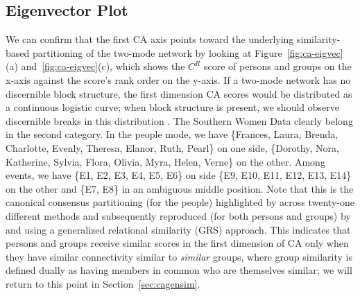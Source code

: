 \documentclass[a4paper,fleqn]{cas-sc}
\begin{document}
\subsection{Eigenvector Plot} \label{subsec:eigplot}
We can confirm that the first CA axis points toward the underlying similarity-based partitioning of the two-mode network by looking at Figure~\ref{fig:ca-eigvec}(a) and~\ref{fig:ca-eigvec}(c), which shows the $C^R$ score of persons and groups on the x-axis against the score's rank order on the y-axis. If a two-mode network has no discernible block structure, the first dimension CA scores would be distributed as a continuous logistic curve; when block structure is present, we should observe discernible breaks in this distribution \citep{van2021correspondence}. The Southern Women Data clearly belong in the second category. In the people mode, we have \{Frances, Laura, Brenda, Charlotte, Evenly, Theresa, Elanor, Ruth, Pearl\} on one side, \{Dorothy, Nora, Katherine, Sylvia, Flora, Olivia, Myra, Helen, Verne\} on the other. Among events, we have \{E1, E2, E3, E4, E5, E6\} on side \{E9, E10, E11, E12, E13, E14\} on the other and \{E7, E8\} in an ambiguous middle position. Note that this is the canonical consensus partitioning (for the people) highlighted by \citet{freeman2003finding} across twenty-one different methods and subsequently reproduced (for both persons and groups) by \citet{kovacs2010generalized} and \citet{lizardo2024two} using a generalized relational similarity (GRS) approach. This indicates that persons and groups receive similar scores in the first dimension of CA only when they have similar connectivity similar to \textit{similar} groups, where group similarity is defined dually as having members in common who are themselves similar; we will return to this point in Section~\ref{sec:cagensim}. 
\end{document}
